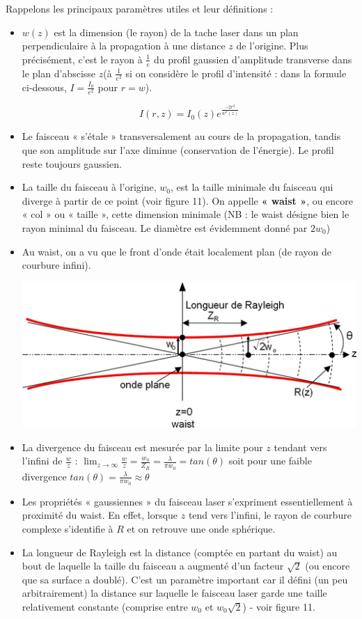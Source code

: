 \documentclass{book}
\begin{document}
Rappelons les principaux paramètres utiles et leur définitions :
\begin{itemize}
    \item $w(z)$ est la dimension (le rayon) de la tache laser dans un plan perpendiculaire à la propagation à une distance $z$ de l'origine. Plus précisément, c'est le rayon à $\frac 1 e$ du profil gaussien d'amplitude transverse dans le plan d'abscisse $z$(à $\frac 1 {e^2}$ si on considère le profil d'intensité : dans la formule ci-dessous, $I=\frac {I_0}{e^2}$ pour $r = w$).
    
    $$I(r, z) = I_0(z)e^{\frac{-2r^2}{w^2(z)}}$$
    
    \item Le faisceau « s'étale » transversalement au cours de la propagation, tandis que son amplitude sur l'axe diminue (conservation de l'énergie). Le profil reste toujours gaussien.
    \item La taille du faisceau à l'origine, $w_0$, est la taille minimale du faisceau qui diverge à partir de ce point (voir figure 11). On appelle \textbf{\color{red}« waist »}, ou encore « col » ou « taille », cette dimension minimale (NB : le waist désigne bien le rayon minimal du faisceau. Le diamètre est évidemment donné par $2w_0$)
    \item Au waist, on a vu que le front d'onde était localement plan (de rayon de courbure infini).
{\centering
\includegraphics[scale=1.7]{images/fig11.jpg}
\par}
    \item La divergence du faisceau est mesurée par la limite pour $z$ tendant vers l'infini de $\frac w z$ : $\lim_{z \to \infty} \frac w z = \frac {w_0}{Z_R} = \frac \lambda {\pi w_0}=tan(\theta)$ soit pour une faible divergence $tan(\theta) = \frac \lambda {\pi w_0} \approx \theta$
    \item Les propriétés « gaussiennes » du faisceau laser s'expriment essentiellement à proximité du waist. En effet, lorsque $z$ tend vers l'infini, le rayon de courbure complexe s'identifie à $R$ et on retrouve une onde sphérique.
    \item La longueur de Rayleigh est la distance (comptée en partant du waist) au bout de laquelle la taille du faisceau a augmenté d'un facteur $\sqrt 2$ (ou encore que sa surface a doublé). C'est un paramètre important car il défini (un peu arbitrairement) la distance sur laquelle le faisceau laser garde une taille relativement constante (comprise entre $w_0$ et $w_0 \sqrt 2$) - voir figure 11.
\end{itemize}
\end{document}
